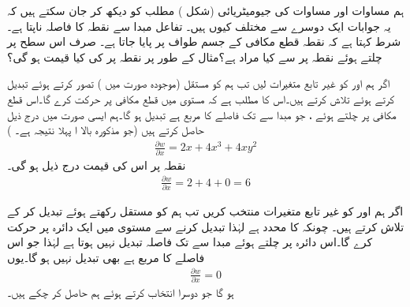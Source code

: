 ہم مساوات  اور مساوات  کی جیومیٹریائی (شکل )  مطلب کو دیکھ کر جان سکتے ہیں کہ یہ جوابات ایک دوسرے سے مختلف  کیوں ہیں۔ تفاعل  مبدا  سے نقطہ  کا فاصلہ ناپتا ہے۔ شرط  کہتا  ہے کہ نقطہ   قطع مکافی  کے جسم طواف پر پایا جاتا ہے۔ صرف اس سطح پر چلتے ہوئے نقطہ  پر   سے کیا مراد ہے؟مثال کے طور پر نقطہ  پر  کی کیا قیمت ہو گی؟

اگر ہم  اور  کو غیر تابع متغیرات لیں تب ہم   کو مستقل (موجودہ صورت میں )  تصور کرتے ہوئے  تبدیل کرتے ہوئے  تلاش کرتے ہیں۔اس کا مطلب ہے کہ  مستوی  میں قطع مکافی  پر حرکت کرے گا۔اس قطع مکافی پر چلتے ہوئے ،  جو مبدا سے  تک فاصلے کا مربع ہے تبدیل ہو گا۔ہم ایسی صورت میں  درج ذیل حاصل کرتے ہیں (جو مذکورہ بالا  ا پہلا نتیجہ ہے۔ )
\begin{align*}
\frac{\partial w}{\partial x}=2x+4x^3+4xy^2
\end{align*}
نقطہ  پر اس کی قیمت درج ذیل ہو گی۔
\begin{align*}
\frac{\partial w}{\partial x}=2+4+0=6
\end{align*}

اگر ہم  اور  کو غیر تابع متغیرات منتخب کریں تب ہم  کو مستقل رکھتے ہوئے  تبدیل کر کے  تلاش کرتے ہیں۔ چونکہ  کا  محدد  ہے لہٰذا  تبدیل کرنے سے    مستوی  میں ایک دائرہ پر حرکت کرے گا۔اس دائرہ پر چلتے ہوئے مبدا سے  تک  فاصلہ تبدیل نہیں ہوتا ہے لہٰذا  جو اس فاصلے کا مربع ہے بھی تبدیل نہیں ہو گا۔یوں
\begin{align*}
\frac{\partial w}{\partial x}=0
\end{align*}
ہو گا جو دوسرا انتخاب  کرتے ہوئے ہم حاصل کر چکے ہیں۔

